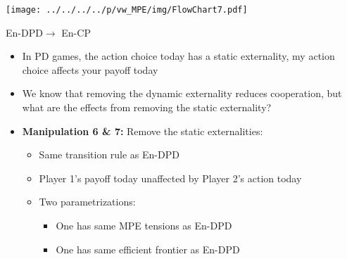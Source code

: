 \documentclass{beamer}
\begin{document}
\begin{frame}


\begin{center}\texttt{[image: ../../../../p/vw\_MPE/img/FlowChart7.pdf]}
\end{center}
\end{frame}


\begin{frame}{En-DPD$\rightarrow$ En-CP}
\begin{itemize}
\item In PD games, the action choice today has a static externality, my
action choice affects your payoff today
\item We know that removing the dynamic externality reduces cooperation,
but what are the effects from removing the static externality?\pause
\item \textbf{Manipulation 6 \& 7:} Remove the static externalities:

\begin{itemize}
\item Same transition rule as En-DPD
\item Player 1's payoff today unaffected by Player 2's action today
\item Two parametrizations:

\begin{itemize}
\item One has same MPE tensions as En-DPD
\item One has same efficient frontier as En-DPD
\end{itemize}
\end{itemize}
\end{itemize}
\end{frame}
\end{document}
